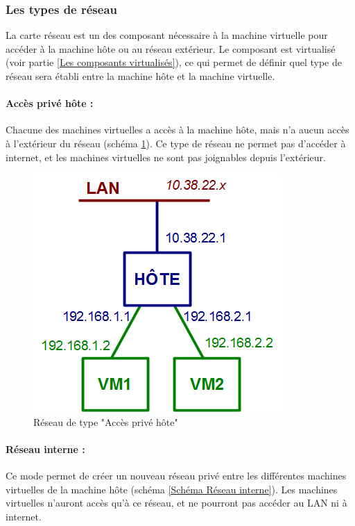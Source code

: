 \subsubsection{Les types de réseau}
\label{Les types de réseau}

La carte réseau est un des composant nécessaire à la machine virtuelle pour accéder à la machine hôte ou au réseau extérieur.
Le composant est virtualisé (voir partie \ref{Les composants virtualisés}), ce qui permet de définir quel type de réseau sera établi entre la machine hôte et la machine virtuelle.
\\


\paragraph{Accès privé hôte :}

Chacune des machines virtuelles a accès à la machine hôte, mais n'a aucun accès à l'extérieur du réseau (schéma \ref{Schéma Accès privé hôte}).
Ce type de réseau ne permet pas d'accéder à internet, et les machines virtuelles ne sont pas joignables depuis l'extérieur.

\begin{figure}[H]
	\center
	\includegraphics[scale=0.5]{images/types_reseau/Acces_prive_hote.png}
	\caption{Réseau de type "Accès privé hôte"}
	\label{Schéma Accès privé hôte}
\end{figure}


\paragraph{Réseau interne :}

Ce mode permet de créer un nouveau réseau privé entre les différentes machines virtuelles de la machine hôte (schéma \ref{Schéma Réseau interne}).
Les machines virtuelles n'auront accès qu'à ce réseau, et ne pourront pas accéder au LAN ni à internet.

